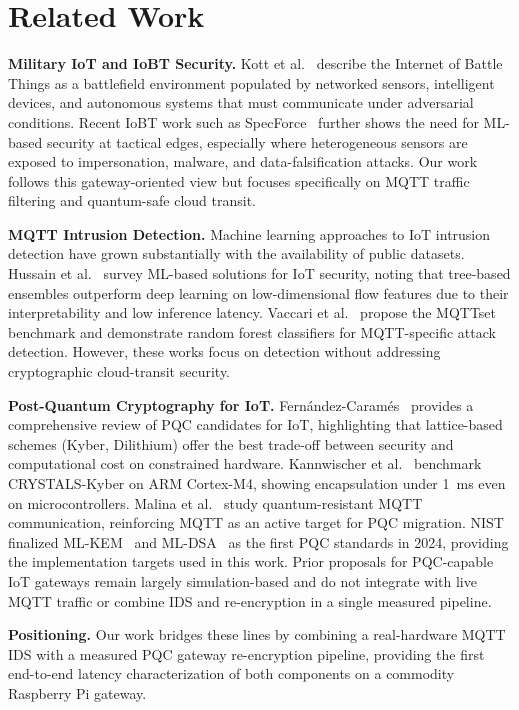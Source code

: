 \documentclass[conference]{IEEEtran}
\begin{document}
\section{Related Work}

\textbf{Military IoT and IoBT Security.} Kott et al.~\cite{kott2016iobt} describe the Internet of Battle Things as a battlefield environment populated by networked sensors, intelligent devices, and autonomous systems that must communicate under adversarial conditions. Recent IoBT work such as SpecForce~\cite{sanchez2023specforce} further shows the need for ML-based security at tactical edges, especially where heterogeneous sensors are exposed to impersonation, malware, and data-falsification attacks. Our work follows this gateway-oriented view but focuses specifically on MQTT traffic filtering and quantum-safe cloud transit.

\textbf{MQTT Intrusion Detection.} Machine learning approaches to IoT intrusion detection have grown substantially with the availability of public datasets. Hussain et al.~\cite{iot_ids_survey} survey ML-based solutions for IoT security, noting that tree-based ensembles outperform deep learning on low-dimensional flow features due to their interpretability and low inference latency. Vaccari et al.~\cite{mqtt_ids_ml} propose the MQTTset benchmark and demonstrate random forest classifiers for MQTT-specific attack detection. However, these works focus on detection without addressing cryptographic cloud-transit security.

\textbf{Post-Quantum Cryptography for IoT.} Fern\'{a}ndez-Caram\'{e}s~\cite{pqc_iot_survey} provides a comprehensive review of PQC candidates for IoT, highlighting that lattice-based schemes (Kyber, Dilithium) offer the best trade-off between security and computational cost on constrained hardware. Kannwischer et al.~\cite{kyber_arm} benchmark CRYSTALS-Kyber on ARM Cortex-M4, showing encapsulation under 1~ms even on microcontrollers. Malina et al.~\cite{malina2024mqttpqc} study quantum-resistant MQTT communication, reinforcing MQTT as an active target for PQC migration. NIST finalized ML-KEM~\cite{nist_fips203} and ML-DSA~\cite{nist_fips204} as the first PQC standards in 2024, providing the implementation targets used in this work. Prior proposals for PQC-capable IoT gateways remain largely simulation-based and do not integrate with live MQTT traffic or combine IDS and re-encryption in a single measured pipeline.

\textbf{Positioning.} Our work bridges these lines by combining a real-hardware MQTT IDS with a measured PQC gateway re-encryption pipeline, providing the first end-to-end latency characterization of both components on a commodity Raspberry Pi gateway.
\end{document}
